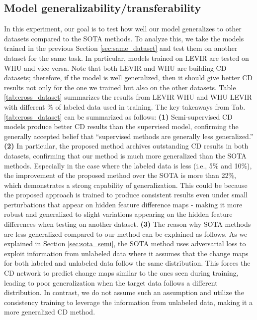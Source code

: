 \documentclass[runningheads]{llncs}
\begin{document}
\vspace{-4mm}
\subsection{Model generalizability/transferability}
\label{sec:cross_dataset}
In this experiment, our goal is to test how well our model generalizes to other datasets compared to the SOTA methods. To analyze this, we take the models trained in the previous Section \ref{sec:same_dataset} and test them on another dataset for the same task. In particular, models trained on LEVIR are tested on WHU and vice versa. Note that both LEVIR and WHU are building CD datasets; therefore, if the model is well generalized, then it should give better CD results not only for the one we trained but also on the other datasets. Table \ref{tab:cross_dataset} summarizes the results from LEVIR  WHU and WHU  LEVIR with different \% of labeled data used in training. The key takeaways from Tab. \ref{tab:cross_dataset} can be summarized as follows: \textbf{(1) } Semi-supervised CD models produce better CD results than the supervised model, confirming the generally accepted belief that ``supervised methods are generally less generalized.'' \textbf{(2)} In particular, the proposed method archives outstanding CD results in both datasets, confirming that our method is much more generalized than the SOTA methods. Especially in the case where the labeled data is less  (i.e., 5\% and 10\%), the improvement of the proposed method over the SOTA is more than 22\%, which demonstrates a strong capability of generalization. This could be because the proposed approach is trained to produce consistent results even under small perturbations that appear on hidden feature difference maps - making it more robust and generalized to slight variations appearing on the hidden feature differences when testing on another dataset. \textbf{(3)} The reason why SOTA methods are less generalized compared to our method can be explained as follows. As we explained in Section \ref{sec:sota_semi}, the SOTA method uses adversarial loss to exploit information from unlabeled data where it assumes that the change maps for both labeled and unlabeled data follow the same distribution.  This forces the CD network to predict change maps similar to the ones seen during training, leading to poor generalization when the target data follows a different distribution. In contrast, we do not assume such an assumption and utilize the consistency training to leverage the information from unlabeled data, making it a more generalized CD method.
\end{document}
